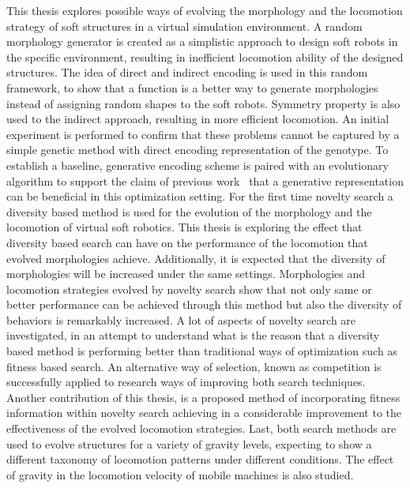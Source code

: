 This thesis explores possible ways of evolving the morphology and the locomotion strategy of soft structures in a virtual simulation environment. A random morphology generator is created as a simplistic approach to design soft robots in the specific environment, resulting in inefficient locomotion ability of the designed structures. The idea of direct and indirect encoding is used in this random framework, to show that a function is a better way to generate morphologies instead of assigning random shapes to the soft robots. Symmetry property is also used to the indirect approach, resulting in more efficient locomotion. An initial experiment is performed to confirm that these problems cannot be captured by a simple genetic method with direct encoding representation of the genotype. To establish a baseline, generative encoding scheme is paired with an evolutionary algorithm to support the claim of previous work~\citep{cheney2013unshackling} that a generative representation can be beneficial in this optimization setting. For the first time novelty search a diversity based method is used for the evolution of the morphology and the locomotion of virtual soft robotics. This thesis is exploring the effect that diversity based search can have on the performance of the locomotion that evolved morphologies achieve. Additionally, it is expected that the diversity of morphologies will be increased under the same settings. Morphologies and locomotion strategies evolved by novelty search show that not only same or better performance can be achieved through this method but also the diversity of behaviors is remarkably increased. A lot of aspects of novelty search are investigated, in an attempt to understand what is the reason that a diversity based method is performing better than traditional ways of optimization such as fitness based search. An alternative way of selection, known as competition is successfully applied to research ways of improving both search techniques. Another contribution of this thesis, is a proposed method of incorporating fitness information within novelty search achieving in a considerable improvement to the effectiveness of the evolved locomotion strategies. Last, both search methods are used to evolve structures for a variety of gravity levels, expecting to show a different taxonomy of locomotion patterns under different conditions. The effect of gravity in the locomotion velocity of mobile machines is also studied.


